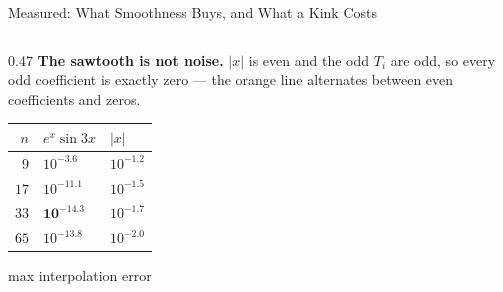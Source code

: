 \begin{frame}{Measured: What Smoothness Buys, and What a Kink Costs}
\begin{columns}[T]
\begin{column}{0.47\textwidth}
\textbf{The sawtooth is not noise.} $|x|$ is even and the odd $T_i$ are odd, so every odd
coefficient is exactly zero --- the orange line alternates between even coefficients and zeros.
\begin{center}\footnotesize
\begin{tabularx}{\linewidth}{@{}r >{\raggedleft\arraybackslash}X >{\raggedleft\arraybackslash}X@{}}
\toprule
$n$ & $e^{x}\sin 3x$ & $|x|$ \\
\midrule
$9$ & $10^{-3.6}$ & $10^{-1.2}$ \\
$17$ & $10^{-11.1}$ & $10^{-1.5}$ \\
$33$ & $\mathbf{10^{-14.3}}$ & $10^{-1.7}$ \\
$65$ & $10^{-13.8}$ & $10^{-2.0}$ \\
\bottomrule
\end{tabularx}
\par{\footnotesize max interpolation error}
\end{center}
\end{column}
\end{columns}
\vspace{1mm}
\end{frame}

